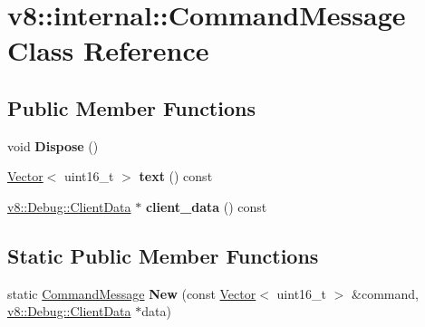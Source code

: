 \hypertarget{classv8_1_1internal_1_1_command_message}{}\section{v8\+:\+:internal\+:\+:Command\+Message Class Reference}
\label{classv8_1_1internal_1_1_command_message}
\subsection*{Public Member Functions}
\begin{DoxyCompactItemize}
\item 
void {\bfseries Dispose} ()\hypertarget{classv8_1_1internal_1_1_command_message_adb4792d62ed12fa1594353a077b4329a}{}\label{classv8_1_1internal_1_1_command_message_adb4792d62ed12fa1594353a077b4329a}

\item 
\hyperlink{classv8_1_1internal_1_1_vector}{Vector}$<$ uint16\+\_\+t $>$ {\bfseries text} () const \hypertarget{classv8_1_1internal_1_1_command_message_a506f0213b13f1ee5fee9fb7c8e5f773e}{}\label{classv8_1_1internal_1_1_command_message_a506f0213b13f1ee5fee9fb7c8e5f773e}

\item 
\hyperlink{classv8_1_1_debug_1_1_client_data}{v8\+::\+Debug\+::\+Client\+Data} $\ast$ {\bfseries client\+\_\+data} () const \hypertarget{classv8_1_1internal_1_1_command_message_a3ff8e0988df7f2dfbc42688d9445b8c3}{}\label{classv8_1_1internal_1_1_command_message_a3ff8e0988df7f2dfbc42688d9445b8c3}

\end{DoxyCompactItemize}
\subsection*{Static Public Member Functions}
\begin{DoxyCompactItemize}
\item 
static \hyperlink{classv8_1_1internal_1_1_command_message}{Command\+Message} {\bfseries New} (const \hyperlink{classv8_1_1internal_1_1_vector}{Vector}$<$ uint16\+\_\+t $>$ \&command, \hyperlink{classv8_1_1_debug_1_1_client_data}{v8\+::\+Debug\+::\+Client\+Data} $\ast$data)\hypertarget{classv8_1_1internal_1_1_command_message_a2ac430ea24de777d5c241791eae663e7}{}\label{classv8_1_1internal_1_1_command_message_a2ac430ea24de777d5c241791eae663e7}

\end{DoxyCompactItemize}
